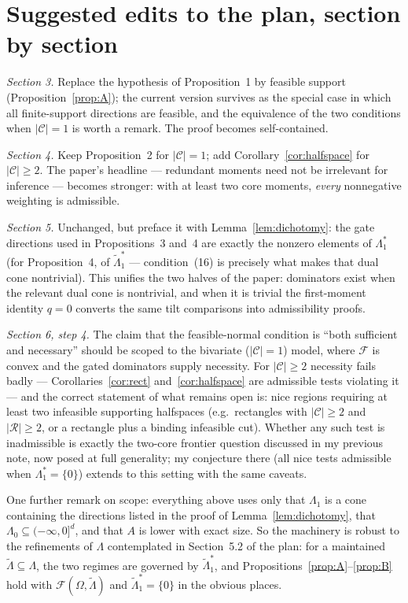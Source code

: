 \documentclass[12pt]{article}
\theoremstyle{remark}
\newcommand{\cC}{\mathcal C}
\newcommand{\cR}{\mathcal R}
\newcommand{\cF}{\mathcal F}
\begin{document}
\section{Suggested edits to the plan, section by section}

\emph{Section 3.} Replace the hypothesis of Proposition~1 by feasible
support (Proposition~\ref{prop:A}); the current version survives as the
special case in which all finite-support directions are feasible, and the
equivalence of the two conditions when $|\cC|=1$ is worth a remark. The
proof becomes self-contained.

\emph{Section 4.} Keep Proposition~2 for $|\cC|=1$; add
Corollary~\ref{cor:halfspace} for $|\cC|\ge2$. The paper's headline ---
redundant moments need not be irrelevant for inference --- becomes
stronger: with at least two core moments, \emph{every} nonnegative
weighting is admissible.

\emph{Section 5.} Unchanged, but preface it with
Lemma~\ref{lem:dichotomy}: the gate directions used in Propositions~3
and~4 are exactly the nonzero elements of $\Lambda_1^*$ (for
Proposition~4, of $\widetilde\Lambda_1^*$ --- condition~(16) is precisely
what makes that dual cone nontrivial). This unifies the two halves of the
paper: dominators exist when the relevant dual cone is nontrivial, and
when it is trivial the first-moment identity $q=0$ converts the same tilt
comparisons into admissibility proofs.

\emph{Section 6, step 4.} The claim that the feasible-normal condition is
``both sufficient and necessary'' should be scoped to the bivariate
($|\cC|=1$) model, where $\cF$ is convex and the gated dominators supply
necessity. For $|\cC|\ge2$ necessity fails badly ---
Corollaries~\ref{cor:rect} and~\ref{cor:halfspace} are admissible tests
violating it --- and the correct statement of what remains open is: nice
regions requiring at least two infeasible supporting halfspaces (e.g.\
rectangles with $|\cC|\ge2$ and $|\cR|\ge2$, or a rectangle plus a binding
infeasible cut). Whether any such test is inadmissible is exactly the
two-core frontier question discussed in my previous note, now posed at
full generality; my conjecture there (all nice tests admissible when
$\Lambda_1^*=\{0\}$) extends to this setting with the same caveats.

One further remark on scope: everything above uses only that $\Lambda_1$
is a cone containing the directions listed in the proof of
Lemma~\ref{lem:dichotomy}, that $\Lambda_0\subseteq(-\infty,0]^d$, and
that $A$ is lower with exact size. So the machinery is robust to the
refinements of $\Lambda$ contemplated in Section~5.2 of the plan: for a
maintained $\widetilde\Lambda\subseteq\Lambda$, the two regimes are
governed by $\widetilde\Lambda_1^*$, and
Propositions~\ref{prop:A}--\ref{prop:B} hold with
$\cF(\Omega,\widetilde\Lambda)$ and $\widetilde\Lambda_1^*=\{0\}$ in the
obvious places.
\end{document}
